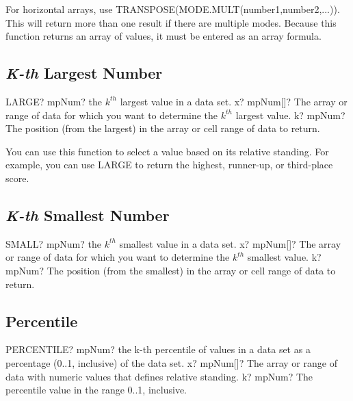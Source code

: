 For horizontal arrays, use \textsf{TRANSPOSE(MODE.MULT(number1,number2,...))}.
This will return more than one result if there are multiple modes. Because this function returns an array of values, it must be entered as an array formula.




\subsection{\textsl{K-th} Largest Number}

\begin{mpFunctionsExtract}
	\mpWorksheetFunctionTwoNotImplemented
	{LARGE? mpNum? the $k^{th}$ largest value in a data set.}
	{x? mpNum[]?  The array or range of data for which you want to determine the $k^{th}$ largest value.}
	{k? mpNum? The position (from the largest) in the array or cell range of data to return.}
\end{mpFunctionsExtract}

\vspace{0.3cm}
You can use this function to select a value based on its relative standing. For example, you can use \textsf{LARGE} to return the highest, runner-up, or third-place score.




\subsection{\textsl{K-th} Smallest Number}

\begin{mpFunctionsExtract}
	\mpWorksheetFunctionTwoNotImplemented
	{SMALL? mpNum? the $k^{th}$ smallest value in a data set.}
	{x? mpNum[]?  The array or range of data for which you want to determine the $k^{th}$ smallest value.}
	{k? mpNum? The position (from the smallest) in the array or cell range of data to return.}
\end{mpFunctionsExtract}





\subsection{Percentile}

\begin{mpFunctionsExtract}
	\mpWorksheetFunctionTwoNotImplemented
	{PERCENTILE? mpNum? the k-th percentile of values  in a data set as a percentage (0..1, inclusive) of the data set.}
	{x? mpNum[]?  The array or range of data with numeric values that defines relative standing.}
	{k? mpNum? The percentile value in the range 0..1, inclusive.}
\end{mpFunctionsExtract}


